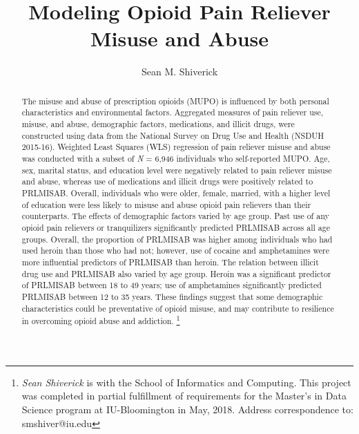 \documentclass[sigconf]{acmart}
\begin{document}
\title{Modeling Opioid Pain Reliever Misuse and Abuse}
  \author{Sean M. Shiverick}

\renewcommand{\shortauthors}{S.M. Shiverick}


\begin{abstract}
  
The misuse and abuse of prescription opioids (MUPO) is influenced by both 
personal characteristics and environmental factors. Aggregated measures of 
pain reliever use, misuse, and abuse, demographic factors, medications, and 
illicit drugs, were constructed using data from the National Survey on Drug 
Use and Health (NSDUH 2015-16). Weighted Least Squares (WLS) regression of 
pain reliever misuse and abuse was conducted with a subset of \textit{N} = 
6,946 individuals who self-reported MUPO. Age, sex, marital status, and 
education level were negatively related to pain reliever misuse and abuse,
whereas use of medications and illicit drugs were positively related to 
PRLMISAB. Overall, individuals who were older, female, married, with a higher
level of education were less likely to misuse and abuse opioid pain relievers 
than their counterparts. The effects of demographic factors varied by age group. 
Past use of any opioid pain relievers or tranquilizers significantly predicted 
PRLMISAB across all age groups. Overall, the proportion of PRLMISAB was higher 
among individuals who had used heroin than those who had not; however, use of 
cocaine and amphetamines were more influential predictors of PRLMISAB than 
heroin. The relation between illicit drug use and PRLMISAB also varied by age 
group. Heroin was a significant predictor of PRLMISAB between 18 to 49 years; 
use of amphetamines significantly predicted PRLMISAB between 12 to 35 years. 
These findings suggest that some demographic characteristics could be 
preventative of opioid misuse, and may contribute to resilience in overcoming 
opioid abuse and addiction. \footnote{\textit{Sean Shiverick} is with the 
School of Informatics and Computing. This project was completed in partial 
fulfillment of requirements for the Master's in Data Science program at 
IU-Bloomington in May, 2018. Address correspondence to: smshiver@iu.edu}

\end{abstract}

\end{document}
